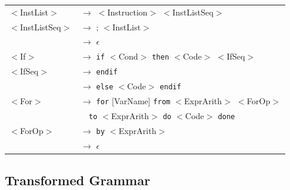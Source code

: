 \documentclass[letterpaper]{article}
\begin{document}
\begin{center}
        \begin{tabular}{l l}
            $<$InstList$>$ & $\rightarrow$ $<$Instruction$>$ $<$InstListSeq$>$\\
            $<$InstListSeq$>$ & $\rightarrow$ ; $<$InstList$>$\\
             & $\rightarrow$ $\epsilon$\\

            $<$If$>$ & $\rightarrow$
            \texttt{if} $<$Cond$>$ \texttt{then} $<$Code$>$ $<$IfSeq$>$\\
            $<$IfSeq$>$ & $\rightarrow$ \texttt{endif}\\
             & $\rightarrow$
             \texttt{else} $<$Code$>$ \texttt{endif}\\

            $<$For$>$ & $\rightarrow$
            \texttt{for} [VarName] \texttt{from}
            $<$ExprArith$>$ $<$ForOp$>$ \\
            &$\quad$\texttt{to}
            $<$ExprArith$>$ \texttt{do} $<$Code$>$ \texttt{done}\\

            $<$ForOp$>$ & $\rightarrow$ \texttt{by} $<$ExprArith$>$\\
             & $\rightarrow$ $\epsilon$\\

        \end{tabular}
\end{center}

\subsection{Transformed Grammar}
\end{document}
